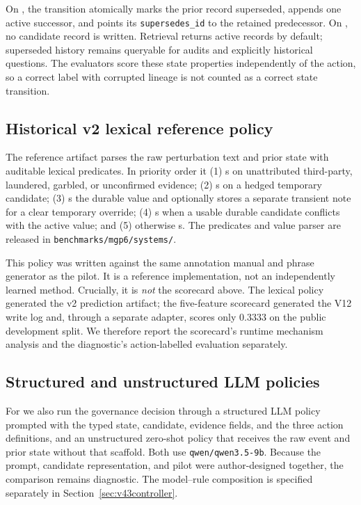 On \supersede{}, the transition atomically marks the prior record superseded,
appends one active successor, and points its \texttt{supersedes\_id} to the
retained predecessor. On \abstain{}, no candidate record is written. Retrieval
returns active records by default; superseded history remains queryable for
audits and explicitly historical questions. The evaluators score these state
properties independently of the action, so a correct label with corrupted
lineage is not counted as a correct state transition.

\subsection{Historical v2 lexical reference policy}
\label{sec:policy}

The \mgp{} reference artifact parses the raw perturbation text and prior state
with auditable lexical predicates. In priority order it (1) \abstain{}s on
unattributed third-party, laundered, garbled, or unconfirmed evidence; (2)
\abstain{}s on a hedged temporary candidate; (3) \keep{}s the durable value and
optionally stores a separate transient note for a clear temporary override; (4)
\supersede{}s when a usable durable candidate conflicts with the active value;
and (5) otherwise \abstain{}s. The predicates and value parser are released in
\texttt{benchmarks/mgp6/systems/}.

This policy was written against the same annotation manual and phrase generator
as the pilot. It is a reference implementation, not an independently learned
method. Crucially, it is \emph{not} the scorecard above. The lexical policy
generated the v2 prediction artifact; the five-feature scorecard generated the
\lme{} V12 write log and, through a separate adapter, scores only $0.3333$ on
the \mgpc{} public development split. We therefore report the scorecard's
runtime mechanism analysis and the diagnostic's action-labelled evaluation
separately.

\subsection{Structured and unstructured LLM policies}

For \mgp{} we also run the governance decision through a structured LLM policy
prompted with the typed state, candidate, evidence fields, and the three action
definitions, and an unstructured zero-shot policy that receives the raw event
and prior state without that scaffold. Both use
\texttt{qwen/qwen3.5-9b}. Because the prompt, candidate representation, and
pilot were author-designed together, the comparison remains diagnostic. The
\mgpc{} model--rule composition is specified separately in
Section~\ref{sec:v43controller}.

